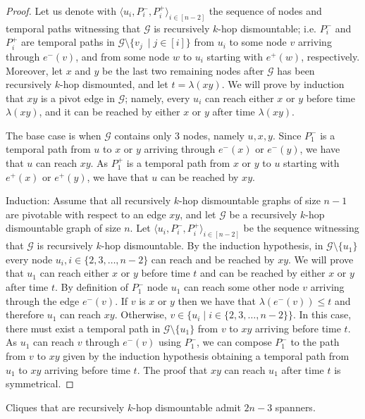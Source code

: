 \documentclass[USenglish, a4paper, thm-restate,numberwithinsect, cleveref]{lipics-v2021}
\newcommand{\G}{\ensuremath{\mathcal{G}}\xspace}
\begin{document}
\begin{proof}
Let us denote with $\langle u_i,P^-_i,P^+_i \rangle_{i\in [n-2]}$ the sequence of nodes and temporal paths witnessing that $\G$ is recursively $k$-hop dismountable; i.e. $P^-_i$ and $P^+_i$ are temporal paths in $\G \setminus \{v_j\ \mid j\in [i]\}$
from $u_i$ to some node $v$ arriving through $e^-(v)$, and from some node $w$ to $u_i$ starting with $e^+(w)$, respectively.
Moreover, let $x$ and $y$ be the last two remaining nodes after $\G$ has been recursively $k$-hop dismounted, and let $t=\lambda(xy)$.
We will prove by induction that $xy$ is a pivot edge in $\G$; namely, every $u_i$ can reach either $x$ or $y$ before time $\lambda(xy)$, and it can be reached by either $x$ or $y$ after time $\lambda(xy)$.

The base case is when $\G$ contains only 3 nodes, namely $u,x,y$.
Since $P^-_1$ is a temporal path from $u$ to $x$ or $y$ arriving through $e^-(x)$ or $e^-(y)$, we have that $u$ can reach $xy$.
As $P^+_1$ is a temporal path from $x$ or $y$ to $u$ starting with $e^+(x)$ or $e^+(y)$, we have that $u$ can be reached by $xy$.

Induction: Assume that all recursively $k$-hop dismountable graphs of size $n-1$ are pivotable with respect to an edge $xy$, and let $\G$ be a recursively $k$-hop dismountable graph of size $n$.
Let $\langle u_i,P^-_i,P^+_i \rangle_{i\in [n-2]}$ be the sequence witnessing that $\G$ is recursively $k$-hop dismountable.
By the induction hypothesis, in $\G\setminus \{u_1\}$ every node $u_i, i\in \{2,3,\dots,n-2\}$ can reach and be reached by $xy$.
We will prove that $u_1$ can reach either $x$ or $y$ before time $t$ and can be reached by either $x$ or $y$ after time $t$.
By definition of $P^-_1$ node $u_1$ can reach some other node $v$ arriving through the edge $e^-(v)$.
If $v$ is $x$ or $y$ then we have that $\lambda(e^-(v))\leq t$ and therefore $u_1$ can reach $xy$.
Otherwise, $v \in \{u_i \mid i\in \{2,3,\dots,n-2\}\}$. In this case, there must exist a temporal path in $\G\setminus \{u_1\}$ from $v$ to $xy$ arriving before time $t$.
As $u_1$ can reach $v$ through $e^-(v)$ using $P^-_1$, we can compose $P^-_1$ to the path from $v$ to $xy$ given by the induction hypothesis obtaining a temporal path from $u_1$ to $xy$ arriving before time $t$.
The proof that $xy$ can reach $u_1$ after time $t$ is symmetrical.
\end{proof}

\begin{corollary}
  Cliques that are recursively $k$-hop dismountable admit $2n-3$ spanners.
\end{corollary}
\end{document}

